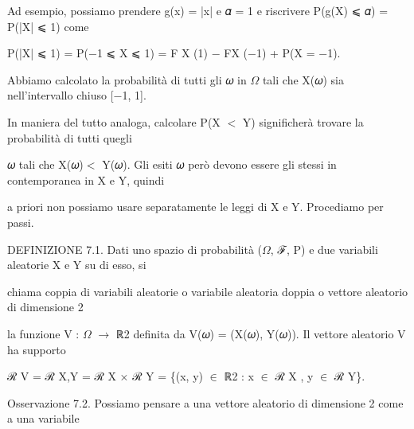 \documentclass[a4paper,portrait,12pt]{article}
\begin{document}
\begin{flushleft}
Ad esempio, possiamo prendere g(x) = |x| e 𝛼 = 1 e riscrivere P(g(X) ⩽ 𝛼) = P(|X| ⩽ 1) come
\end{flushleft}


\begin{flushleft}
P(|X| ⩽ 1) = P($-$1 ⩽ X ⩽ 1) = F X (1) $-$ FX ($-$1) + P(X = $-$1).
\end{flushleft}


\begin{flushleft}
Abbiamo calcolato la probabilit\`{a} di tutti gli 𝜔 in $\Omega$ tali che X(𝜔) sia nell'intervallo chiuso [$-$1, 1].
\end{flushleft}


\begin{flushleft}
In maniera del tutto analoga, calcolare P(X $<$ Y) significher\`{a} trovare la probabilit\`{a} di tutti quegli
\end{flushleft}


\begin{flushleft}
𝜔 tali che X(𝜔)$<$ Y(𝜔). Gli esiti 𝜔 per\`{o} devono essere gli stessi in contemporanea in X e Y, quindi
\end{flushleft}


\begin{flushleft}
a priori non possiamo usare separatamente le leggi di X e Y. Procediamo per passi.
\end{flushleft}


\begin{flushleft}
DEFINIZIONE 7.1. Dati uno spazio di probabilit\`{a} ($\Omega$, ℱ, P) e due variabili aleatorie X e Y su di esso, si
\end{flushleft}


\begin{flushleft}
chiama coppia di variabili aleatorie o variabile aleatoria doppia o vettore aleatorio di dimensione 2
\end{flushleft}


\begin{flushleft}
la funzione V : $\Omega$ $\rightarrow$ ℝ2 definita da V(𝜔) = (X(𝜔), Y(𝜔)). Il vettore aleatorio V ha supporto
\end{flushleft}


\begin{flushleft}
ℛ V = ℛ X,Y = ℛ X × ℛ Y = \{(x, y) $\in$ ℝ2 : x $\in$ ℛ X , y $\in$ ℛ Y\}.
\end{flushleft}


\begin{flushleft}
Osservazione 7.2. Possiamo pensare a una vettore aleatorio di dimensione 2 come a una variabile
\end{flushleft}
\end{document}
